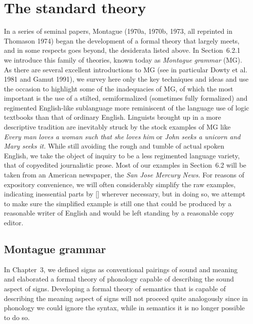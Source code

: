 \section{The standard theory}

In a series of seminal papers, Montague (1970a, 1970b, 1973, all reprinted in
Thomason 1974) began the development of a formal theory that largely meets,
and in some respects goes beyond, the desiderata listed above. In
Section~6.2.1 we introduce this family of theories, known today as {\it
  Montague grammar} (MG). As there are several excellent introductions to MG
(see in particular Dowty et al. 1981 and Gamut 1991), \nocite{Dowty:1981}
\nocite{Gamut:1991} we survey here only the key techniques and ideas and use
the occasion to highlight some of the inadequacies of MG, of which the most
important is the use of a stilted, semiformalized (sometimes fully formalized)
and regimented English-like sublanguage more reminiscent of the language use
of logic textbooks than that of ordinary English.  \nocite{Montague:1970}
\nocite{Montague:1970a} \nocite{Montague:1973} \nocite{Thomason:1974}
Linguists brought up in a more descriptive tradition are inevitably struck by
the stock examples of MG like {\it Every man loves a woman such that she loves
  him} or {\it John seeks a unicorn and Mary seeks it.} While still avoiding
the rough and tumble of actual spoken English, we take the object of inquiry
to be a less regimented language variety, that of copyedited journalistic
prose.  Most of our examples in Section~6.2 will be taken from an American
newspaper, the {\it San Jose Mercury News.} For reasons of expository
convenience, we will often considerably simplify the raw examples, indicating
inessential parts by [] wherever necessary, but in doing so, we attempt to
make sure the simplified example is still one that could be produced by a
reasonable writer of English and would be left standing by a reasonable
copy editor.   \nocite{Montague:1970}
\nocite{Montague:1970a} \nocite{Montague:1973} \nocite{Thomason:1974}

\subsection{Montague grammar}

In Chapter~3, we defined signs as conventional pairings of sound and meaning
and elaborated a formal theory of phonology capable of describing the sound
aspect of signs. Developing a formal theory of semantics that is capable of
describing the meaning aspect of signs will not proceed quite analogously
since in phonology we could ignore the syntax, while in semantics it is no
longer possible to do so.

